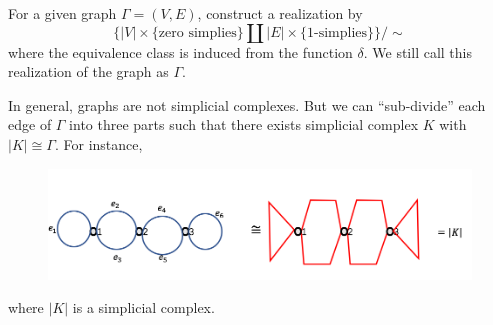 \begin{definition}
For a given graph $\Gamma=(V,E)$, construct a realization by
\[
\{
|V|\times\{\text{zero simplies}\}
\coprod
|E|\times\{\text{$1$-simplies}\}
\}/\sim
\]
where the equivalence class is induced from the function $\delta$. 
We still call this realization of the graph as $\Gamma$.
\end{definition}


\begin{remark}
In general, graphs are not simplicial complexes.
But we can ``sub-divide'' each edge of $\Gamma$ into three parts such that there exists simplicial complex $K$ with $|K|\cong\Gamma$. For instance, 
\begin{figure}[H]
\centering
\includegraphics[width=\textwidth]{week14/f_24}
\end{figure}
where $|K|$ is a simplicial complex.
\end{remark}

